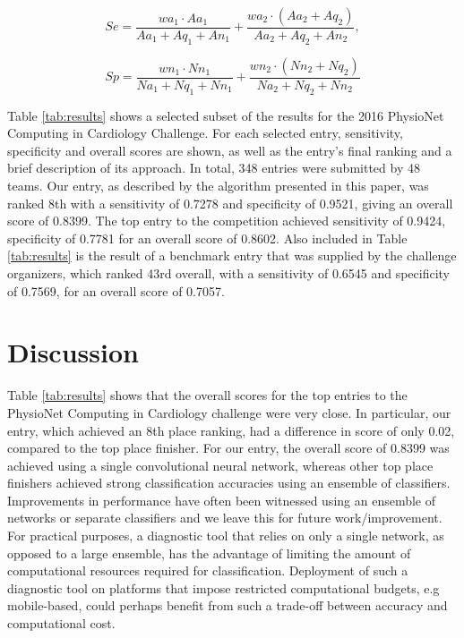 \documentclass{article}
\begin{document}
\begin{equation}
Se = \frac{wa_1 \cdot Aa_1}{Aa_1 + Aq_1 + An_1} + \frac{wa_2 \cdot (Aa_2 +Aq_2)}{Aa_2 + Aq_2 + An_2},
\label{eqn:se}
\end{equation}

\begin{equation}
Sp = \frac{wn_1 \cdot Nn_1}{Na_1 +Nq_1 +Nn_1} + \frac{wn_2 \cdot (Nn_2 + Nq_2)}{Na_2 + Nq_2 + Nn_2}
\label{eqn:sp}
\end{equation}

Table \ref{tab:results} shows a selected subset of the results for the 2016 PhysioNet Computing in Cardiology Challenge. For each selected entry, sensitivity, specificity and overall scores are shown, as well as the entry's final ranking and a brief description of its approach. In total, 348 entries were submitted by 48 teams. Our entry, as described by the algorithm presented in this paper, was ranked 8th with a sensitivity of 0.7278 and specificity of 0.9521, giving an overall score of 0.8399. The top entry to the competition achieved sensitivity of 0.9424, specificity of 0.7781 for an overall score of 0.8602. Also included in Table \ref{tab:results} is the result of a benchmark entry that was supplied by the challenge organizers, which ranked 43rd overall, with a sensitivity of 0.6545 and specificity of 0.7569, for an overall score of 0.7057.

\section{Discussion}
\label{sec:discussion}

Table \ref{tab:results} shows that the overall scores for the top entries to the PhysioNet Computing in Cardiology challenge were very close. In particular, our entry, which achieved an 8th place ranking, had a difference in score of only 0.02, compared to the top place finisher. For our entry, the overall score of 0.8399 was achieved using a single convolutional neural network, whereas other top place finishers achieved strong classification accuracies using an ensemble of classifiers. Improvements in performance have often been witnessed using an ensemble of networks or separate classifiers and we leave this for future work/improvement. For practical purposes, a diagnostic tool that relies on only a single network, as opposed to a large ensemble, has the advantage of limiting the amount of computational resources required for classification. Deployment of such a diagnostic tool on platforms that impose restricted computational budgets, e.g mobile-based, could perhaps benefit from such a trade-off between accuracy and computational cost.
\end{document}
